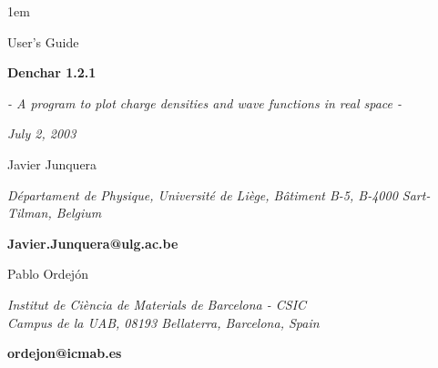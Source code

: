 %
%
%
%



\textheight 22cm
\textwidth 16cm
\oddsidemargin 1mm
\topmargin -15mm

\baselineskip=14pt
\parskip 5pt
\parindent 1em




\begin{titlepage}

\begin{center}

\vspace{1cm}

{\huge {\sc User's Guide}}

\vspace{4cm}

{\Huge {\bf {\sc Denchar} 1.2.1} }

\vspace{0.5 cm}

{\Large {\it - A program to plot charge densities and wave functions 
in real space -}}


\vspace{3cm}

{\Large {\it July 2, 2003} }

\vspace{3cm}
{\Large Javier Junquera}

\vspace{5pt}

{\it D\'epartament de Physique, Universit\'e de Li\`ege,
B\^atiment B-5, B-4000 Sart-Tilman, Belgium}

\vspace{2pt}
{\bf Javier.Junquera@ulg.ac.be}

\vspace{1cm}

{\Large Pablo Ordej\'on}

\vspace{5pt}

{\it Institut de Ci\`encia de Materials de Barcelona - CSIC\\
Campus de la UAB, 08193 Bellaterra, Barcelona, Spain}

\vspace{2pt}
{\bf ordejon@icmab.es}
\vspace{7mm}
\end{center}

\end{titlepage}

